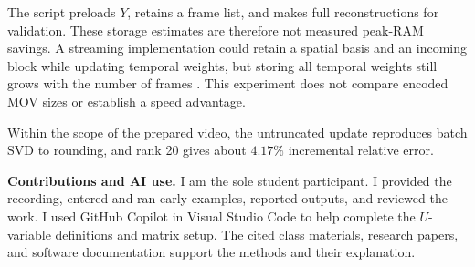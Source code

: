\documentclass[11pt,a4paper]{article}
\begin{document}
The script preloads \(Y\), retains a frame list, and makes full reconstructions
for validation. These storage estimates are therefore not measured peak-RAM
savings. A streaming implementation could retain a spatial basis and an
incoming block while updating temporal weights, but storing all temporal
weights still grows with the number of frames \cite{kuhl}. This experiment
does not compare encoded MOV sizes or establish a speed advantage.

Within the scope of the prepared video, the untruncated update
reproduces batch SVD to rounding, and rank 20 gives about \(4.17\%\)
incremental relative error.

\begingroup\small
{}\label{sec:class-notes}
\textbf{Contributions and AI use.}
I am the sole student participant. I provided the recording, entered and ran
early examples, reported outputs, and reviewed the work. I used GitHub Copilot
in Visual Studio Code to help complete the \(U\)-variable definitions and
matrix setup. The cited class materials, research papers, and software
documentation support the methods and their explanation.
\endgroup
\end{document}
